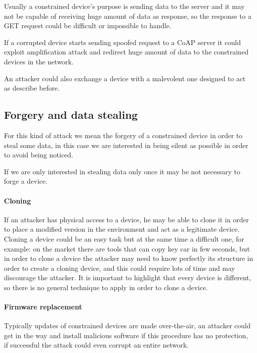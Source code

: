 	Usually a constrained device's purpose is sending data to the server and it may not be capable of receiving huge amount of data as response, so the response to a GET request could be difficult or impossible to handle.\newline
	
	If a corrupted device starts sending spoofed request to a CoAP server it could exploit amplification attack and redirect huge amount of data to the constrained devices in the network.\newline
	
	An attacker could also exchange a device with a malevolent one designed to act as describe before.\newline
	
	\subsection{Forgery and data stealing}
	For this kind of attack we mean the forgery of a constrained device in order to steal some data, in this case we are interested in being silent as possible in order to avoid being noticed.\newline
	
	If we are only interested in stealing data only once it may be not necessary to forge a device.\newline
	
	\paragraph{Cloning}
	If an attacker has physical access to a device, he may be able to clone it in order to place a modified version in the environment and act as a legitimate device.\newline
	Cloning a device could be an easy task but at the same time a difficult one, for example: on the market there are tools that can copy key car in few seconds, but in order to clone a device the attacker may need to know perfectly its structure in order to create a cloning device, and this could require lots of time and may discourage the attacker.\newline
	It is important to highlight that every device is different, so there is no general technique to apply in order to clone a device.\newline
	
	\paragraph{Firmware replacement}
	Typically updates of constrained devices are made over-the-air, an attacker could get in the way and install malicious software if this procedure has no protection, if successful the attack could even corrupt an entire network.\newline
	
